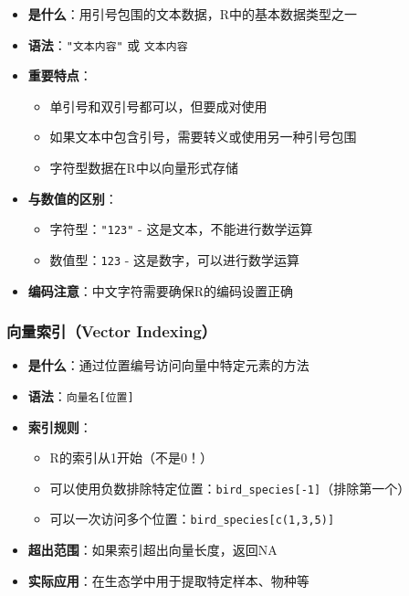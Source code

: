 \documentclass[
]{book}
\providecommand{\tightlist}{%
  \setlength{\itemsep}{0pt}\setlength{\parskip}{0pt}}
\begin{document}
\begin{itemize}
\tightlist
\item
  \textbf{是什么}：用引号包围的文本数据，R中的基本数据类型之一
\item
  \textbf{语法}：\texttt{"文本内容"} 或 \texttt{\textquotesingle{}文本内容\textquotesingle{}}
\item
  \textbf{重要特点}：

  \begin{itemize}
  \tightlist
  \item
    单引号和双引号都可以，但要成对使用
  \item
    如果文本中包含引号，需要转义或使用另一种引号包围
  \item
    字符型数据在R中以向量形式存储
  \end{itemize}
\item
  \textbf{与数值的区别}：

  \begin{itemize}
  \tightlist
  \item
    字符型：\texttt{"123"} - 这是文本，不能进行数学运算
  \item
    数值型：\texttt{123} - 这是数字，可以进行数学运算
  \end{itemize}
\item
  \textbf{编码注意}：中文字符需要确保R的编码设置正确
\end{itemize}

\hypertarget{ux5411ux91cfux7d22ux5f15vector-indexing}{%
\subsubsection{向量索引（Vector Indexing）}\label{ux5411ux91cfux7d22ux5f15vector-indexing}}

\begin{itemize}
\tightlist
\item
  \textbf{是什么}：通过位置编号访问向量中特定元素的方法
\item
  \textbf{语法}：\texttt{向量名{[}位置{]}}
\item
  \textbf{索引规则}：

  \begin{itemize}
  \tightlist
  \item
    R的索引从1开始（不是0！）
  \item
    可以使用负数排除特定位置：\texttt{bird\_species{[}-1{]}}（排除第一个）
  \item
    可以一次访问多个位置：\texttt{bird\_species{[}c(1,3,5){]}}
  \end{itemize}
\item
  \textbf{超出范围}：如果索引超出向量长度，返回NA
\item
  \textbf{实际应用}：在生态学中用于提取特定样本、物种等
\end{itemize}
\end{document}
